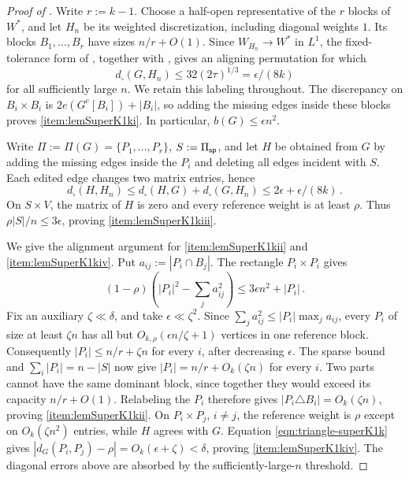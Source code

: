 \begin{proof}[Proof of ]
Write $r:=k-1$. Choose a half-open representative of the $r$ blocks of $W^\ast$, and let $H_n$ be its weighted discretization, including diagonal weights $1$. Its blocks $B_1,\dots,B_r$ have sizes $n/r+O(1)$. Since $W_{H_n}\to W^\ast$ in $L^1$, the fixed-tolerance form of \cite[Theorem~2.3 and the remark on p.~1831]{borgs2008convergent}, together with \cite[Lemma~8.9]{lovasz2012large}, gives an aligning permutation for which
$$d_\square(G,H_n)\leq32(2\tau)^{1/3}=\epsilon/(8k)$$
for all sufficiently large $n$. We retain this labeling throughout. The discrepancy on $B_i\times B_i$ is $2e(G^c[B_i])+|B_i|$, so adding the missing edges inside these blocks proves \ref{item:lemSuperK1ki}. In particular, $b(G)\leq\epsilon n^2$.

Write $\Pi:=\Pi(G)=\{P_1,\dots,P_r\}$, $S:=\Pi_{\mathsf{sp}}$, and let $H$ be obtained from $G$ by adding the missing edges inside the $P_i$ and deleting all edges incident with $S$. Each edited edge changes two matrix entries, hence
\begin{equation}\label{eqn:triangle-superK1k}
d_\square(H,H_n)\leq d_\square(H,G)+d_\square(G,H_n)\leq2\epsilon+\epsilon/(8k)\,.
\end{equation}
On $S\times V$, the matrix of $H$ is zero and every reference weight is at least $\rho$. Thus $\rho|S|/n\leq3\epsilon$, proving \ref{item:lemSuperK1kiii}.

We give the alignment argument for \ref{item:lemSuperK1kii} and \ref{item:lemSuperK1kiv}. Put $a_{ij}:=|P_i\cap B_j|$. The rectangle $P_i\times P_i$ gives
$$(1-\rho)\left(|P_i|^2-\sum_j a_{ij}^2\right)\leq3\epsilon n^2+|P_i|\,.$$
Fix an auxiliary $\zeta\ll\delta$, and take $\epsilon\ll\zeta^2$. Since $\sum_j a_{ij}^2\leq|P_i|\max_j a_{ij}$, every $P_i$ of size at least $\zeta n$ has all but $O_{k,\rho}(\epsilon n/\zeta+1)$ vertices in one reference block. Consequently $|P_i|\leq n/r+\zeta n$ for every $i$, after decreasing $\epsilon$. The sparse bound and $\sum_i|P_i|=n-|S|$ now give $|P_i|=n/r+O_k(\zeta n)$ for every $i$. Two parts cannot have the same dominant block, since together they would exceed its capacity $n/r+O(1)$. Relabeling the $P_i$ therefore gives $|P_i\triangle B_i|=O_k(\zeta n)$, proving \ref{item:lemSuperK1kii}. On $P_i\times P_j$, $i\neq j$, the reference weight is $\rho$ except on $O_k(\zeta n^2)$ entries, while $H$ agrees with $G$. Equation \eqref{eqn:triangle-superK1k} gives $|d_G(P_i,P_j)-\rho|=O_k(\epsilon+\zeta)<\delta$, proving \ref{item:lemSuperK1kiv}. The diagonal errors above are absorbed by the sufficiently-large-$n$ threshold.


\end{proof}
